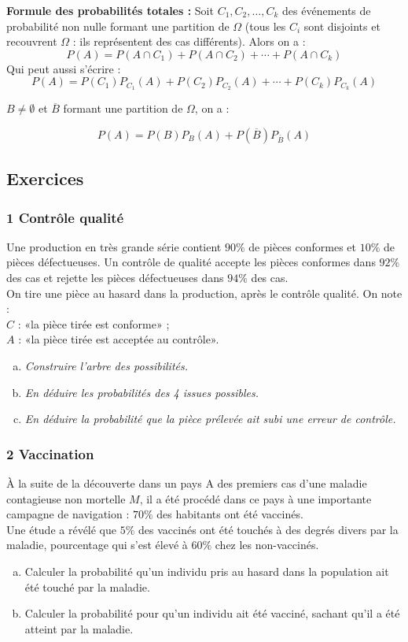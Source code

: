 \documentclass[a4paper,11pt]{article} \usepackage{FBarticle} \mapage{831}{Probabilités 1} %
\begin{document}
\begin{multicols}{2}
\prop \textbf{Formule des probabilités totales :}
Soit $C_1, C_2, \ldots,C_k$ des événements de probabilité non nulle formant une partition de $\Omega$ (tous les $C_i$ sont disjoints et recouvrent $\Omega$ : ils représentent des cas différents). Alors on a :
$$P(A)=P(A\cap C_1)+P(A\cap C_2)+\cdots+P(A\cap C_k)$$
Qui peut aussi s'écrire :
$$P(A)=P(C_1)P_{C_1}(A)+P(C_2)P_{C_2}(A)+\cdots+P(C_k)P_{C_k}(A)$$

\rema $B\neq\emptyset$ et $\overline{B}$ formant une partition de $\Omega$, on a :

$$P(A)=P(B)P_{B}(A)+P(\overline{B})P_{\overline{B}}(A)$$
\newpage
\subsection{Exercices}
\subsubsection*{1 Contrôle qualité}
Une production en très grande série contient $90\%$ de pièces conformes et $10\%$ de pièces défectueuses. Un contrôle de qualité accepte les pièces conformes dans $92\%$ des cas et rejette les pièces défectueuses dans $94\%$ des cas.\\
On tire une pièce au hasard dans la production, après le contrôle qualité.
On note :\\
$C$ : «la pièce tirée est conforme» ; \\
$A$ : «la pièce tirée est acceptée au contrôle». \\
\begin{enumerate}[a)]
\item \emph{Construire l'arbre des possibilités.}
\item \emph{En déduire les probabilités des 4 issues possibles.}
\item \emph{En déduire la probabilité que la pièce prélevée ait subi une erreur de contrôle.}
\end{enumerate}

\subsubsection*{2 Vaccination}
À la suite de la découverte dans un pays A des premiers cas d'une maladie contagieuse non mortelle $M$, il a été procédé dans ce pays à une importante campagne de navigation : $70\%$ des habitants ont été vaccinés.\\
Une étude a révélé que $5\%$ des vaccinés ont été touchés à des degrés divers par la maladie, pourcentage qui s'est élevé à $60\%$ chez les non-vaccinés.
\begin{enumerate}[a)]
\item Calculer la probabilité qu'un individu pris au hasard dans la population ait été touché par la maladie.
\item Calculer la probabilité pour qu'un individu ait été vacciné, sachant qu'il a été atteint par la maladie.
\end{enumerate}


\end{multicols}
\end{document}
